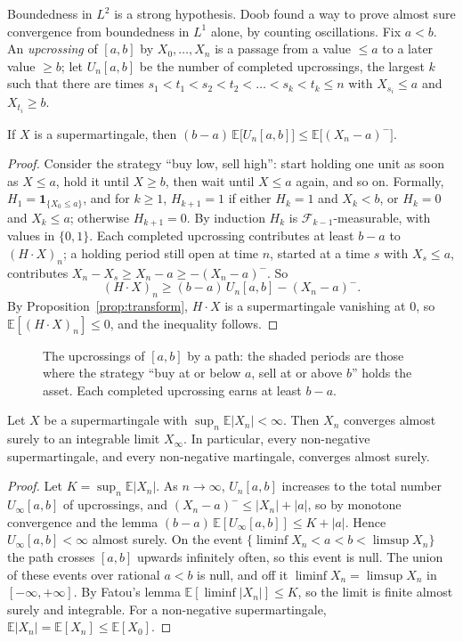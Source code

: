 Boundedness in $L^2$ is a strong hypothesis. Doob found a way to prove almost sure convergence from boundedness in
$L^1$ alone, by counting oscillations. Fix $a<b$. An \emph{upcrossing} of $[a,b]$ by $X_0,\dots,X_n$ is a passage from a value $\le a$ to a later
value $\ge b$; let $U_n[a,b]$ be the number of completed upcrossings, the largest $k$ such that there are times
$s_1<t_1<s_2<t_2<\dots<s_k<t_k\le n$ with $X_{s_i}\le a$ and $X_{t_i}\ge b$.

\begin{lemma}\label{lem:upcrossing}
If $X$ is a supermartingale, then $(b-a)\,\mathbb E\bigl[U_n[a,b]\bigr]\le\mathbb E\bigl[(X_n-a)^-\bigr]$.
\end{lemma}
\begin{proof}
Consider the strategy ``buy low, sell high'': start holding one unit as soon as $X\le a$, hold it until $X\ge b$, then wait until
$X\le a$ again, and so on. Formally, $H_1=\mathbf 1_{\{X_0\le a\}}$, and for $k\ge1$, $H_{k+1}=1$ if either $H_k=1$ and $X_k<b$, or $H_k=0$ and $X_k\le a$; otherwise $H_{k+1}=0$.
By induction $H_k$ is $\mathcal F_{k-1}$-measurable, with values in $\{0,1\}$. Each completed upcrossing contributes at least $b-a$ to $(H\cdot X)_n$; a
holding period still open at time $n$, started at a time $s$ with $X_s\le a$, contributes $X_n-X_s\ge X_n-a\ge-(X_n-a)^-$. So
\[
(H\cdot X)_n\ge(b-a)\,U_n[a,b]-(X_n-a)^-.
\]
By Proposition~\ref{prop:transform}, $H\cdot X$ is a supermartingale vanishing at $0$, so $\mathbb E[(H\cdot X)_n]\le0$, and the inequality follows.
\end{proof}

\begin{figure}[ht]
\centering
{}
\caption{The upcrossings of $[a,b]$ by a path: the shaded periods are those where the strategy ``buy at or below $a$, sell at or
above $b$'' holds the asset. Each completed upcrossing earns at least $b-a$.}
\label{fig:upcross}
\end{figure}

\begin{theorem}\label{thm:supconv}
Let $X$ be a supermartingale with $\sup_n\mathbb E|X_n|<\infty$. Then $X_n$ converges almost surely to an integrable limit $X_\infty$. In particular,
every non-negative supermartingale, and every non-negative martingale, converges almost surely.
\end{theorem}
\begin{proof}
Let $K=\sup_n\mathbb E|X_n|$. As $n\to\infty$, $U_n[a,b]$ increases to the total number $U_\infty[a,b]$ of upcrossings, and $(X_n-a)^-\le|X_n|+|a|$, so by monotone
convergence and the lemma $(b-a)\,\mathbb E[U_\infty[a,b]]\le K+|a|$. Hence $U_\infty[a,b]<\infty$ almost surely. On the event $\{\liminf X_n<a<b<\limsup X_n\}$ the path
crosses $[a,b]$ upwards infinitely often, so this event is null. The union of these events over rational $a<b$ is null, and off it
$\liminf X_n=\limsup X_n$ in $[-\infty,+\infty]$. By Fatou's lemma $\mathbb E[\liminf|X_n|]\le K$, so the limit is finite almost surely and integrable. For a
non-negative supermartingale, $\mathbb E|X_n|=\mathbb E[X_n]\le\mathbb E[X_0]$.
\end{proof}

